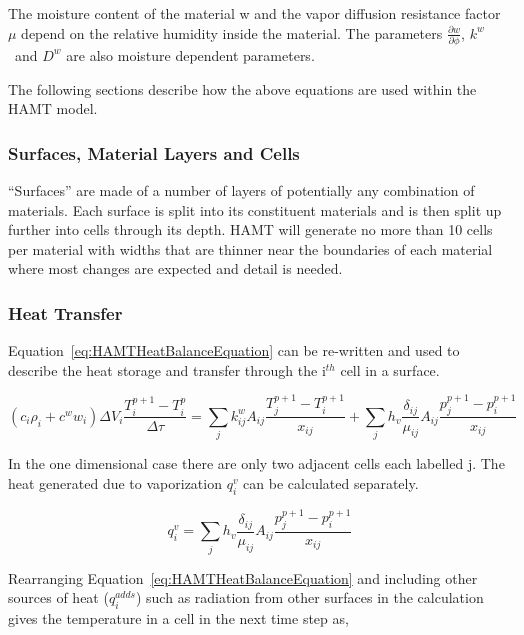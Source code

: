 The moisture content of the material w and the vapor diffusion resistance
factor $\mu$ depend on the relative humidity inside the material. The
parameters \(\frac{\partial w}{\partial \phi}\), \(k^w\) ~and \(D^w\) are
also moisture dependent parameters.

The following sections describe how the above equations are used within
the HAMT model.

\subsubsection{Surfaces, Material Layers and Cells}\label{surfaces-material-layers-and-cells}

``Surfaces'' are made of a number of layers of potentially any combination
of materials. Each surface is split into its constituent materials and is
then split up further into cells through its depth. HAMT will generate no
more than 10 cells per material with widths that are thinner near the
boundaries of each material where most changes are expected and detail is
needed.

\subsubsection{Heat Transfer}\label{heat-transfer}

Equation~\ref{eq:HAMTHeatBalanceEquation} can be re-written and used to
describe the heat storage and transfer through the i\(^{th}\) cell in a
surface.

\begin{equation}
\left( {{c_i}{\rho_i} + {c^w}{w_i}} \right)\Delta {V_i}\frac{{T_i^{p + 1} - T_i^p}}{{\Delta \tau }} = \sum\limits_j {k_{ij}^w{A_{ij}}\frac{{T_j^{p + 1} - T_i^{p + 1}}}{x_{ij}}}  + \sum\limits_j {{h_v}\frac{{{\delta_{ij}}}}{\mu_{ij}}{A_{ij}}\frac{{p_j^{p + 1} - p_i^{p + 1}}}{x_{ij}}}
\end{equation}

In the one dimensional case there are only two adjacent cells each labelled
j. The heat generated due to vaporization \(q_i^v\) can be calculated
separately.

\begin{equation}
q_i^v = \sum\limits_j {{h_v}\frac{{{\delta_{ij}}}}{\mu_{ij}}{A_{ij}}\frac{{p_j^{p + 1} - p_i^{p + 1}}}{x_{ij}}}
\end{equation}

Rearranging Equation~\ref{eq:HAMTHeatBalanceEquation} and including other
sources of heat (\(q_i^{adds}\)) such as radiation from other surfaces in
the calculation gives the temperature in a cell in the next time step as,

